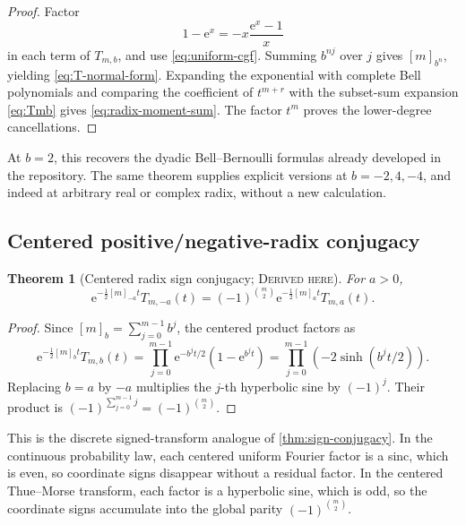 \documentclass[11pt,oneside]{article}
\newtheorem{theorem}{Theorem}[section]
\theoremstyle{definition}
\theoremstyle{remark}
\newcommand{\e}{\mathrm e}
\newcommand{\Derived}{\textsc{Derived here}}
\begin{document}
\begin{proof}
Factor
\[
 1-\e^x=-x\frac{\e^x-1}{x}
\]
in each term of \(T_{m,b}\), and use \eqref{eq:uniform-cgf}.  Summing
\(b^{nj}\) over \(j\) gives \([m]_{b^n}\), yielding
\eqref{eq:T-normal-form}.  Expanding the exponential with complete Bell
polynomials and comparing the coefficient of \(t^{m+r}\) with the subset-sum
expansion \eqref{eq:Tmb} gives \eqref{eq:radix-moment-sum}.  The factor \(t^m\)
proves the lower-degree cancellations.
\end{proof}

At \(b=2\), this recovers the dyadic Bell--Bernoulli formulas already developed
in the repository.  The same theorem supplies explicit versions at
\(b=-2,4,-4\), and indeed at arbitrary real or complex radix, without a new
calculation.

\subsection{Centered positive/negative-radix conjugacy}
\begin{theorem}[Centered radix sign conjugacy; \Derived]\label{thm:radix-sign}
For \(a>0\),
\begin{equation}\label{eq:radix-sign}
 \e^{-\frac12[m]_{-a}t}T_{m,-a}(t)
 =(-1)^{\binom m2}
 \e^{-\frac12[m]_at}T_{m,a}(t).
\end{equation}
\end{theorem}

\begin{proof}
Since \([m]_b=\sum_{j=0}^{m-1}b^j\), the centered product factors as
\[
 \e^{-\frac12[m]_bt}T_{m,b}(t)
 =\prod_{j=0}^{m-1}\e^{-b^jt/2}(1-\e^{b^jt})
 =\prod_{j=0}^{m-1}(-2\sinh(b^jt/2)).
\]
Replacing \(b=a\) by \(-a\) multiplies the \(j\)-th hyperbolic sine by
\((-1)^j\).  Their product is
\((-1)^{\sum_{j=0}^{m-1}j}=(-1)^{\binom m2}\).
\end{proof}

This is the discrete signed-transform analogue of
\cref{thm:sign-conjugacy}.  In the continuous probability law, each centered
uniform Fourier factor is a sinc, which is even, so coordinate signs disappear
without a residual factor.  In the centered Thue--Morse transform, each factor
is a hyperbolic sine, which is odd, so the coordinate signs accumulate into the
global parity \((-1)^{\binom m2}\).
\end{document}
